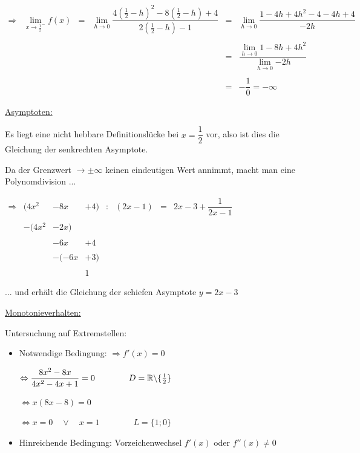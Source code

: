 \documentclass[main.tex]{subfiles}
\begin{document}
$\begin{array}{rccccl}
	\Rightarrow &  \lim\limits_{x \rightarrow {\frac{1}{2}}^{-}} {f(x)} &=& \lim\limits_{h \rightarrow 0} {\dfrac{4(\frac{1}{2} -h)^2 -8(\frac{1}{2} -h) +4}{2(\frac{1}{2}-h) -1} } &=& \lim\limits_{h \rightarrow 0} \dfrac{1-4h+4h^2-4-4h+4}{-2h} \\ \\
	&&&&=& \dfrac{\lim\limits_{h \rightarrow 0} {1-8h+4h^2} }{\lim\limits_{h \rightarrow 0}{-2h}} \\ \\
	&&&&=& -\dfrac {1}{0} = - \infty
\end{array}$

\underline{Asymptoten:}

Es liegt eine nicht hebbare Definitionslücke bei $x=\dfrac{1}{2}$ vor, also ist dies die Gleichung der senkrechten Asymptote.

Da der Grenzwert $\rightarrow \pm \infty$ keinen eindeutigen Wert annimmt, macht man eine Polynomdivision ...

$\begin{array}{rccccccl}
	\Rightarrow & (4x^2 & -8x & +4) & : & (2x-1) &=& 2x-3+\dfrac{1}{2x-1} \\ \\
	& -(4x^2 & -2x) & & & & & \\ \\
	& & -6x & +4 & & & & \\ \\
	& & -(-6x & +3) & & & & \\ \\
	& & & 1 & & & &
\end{array}$

... und erhält die Gleichung der schiefen Asymptote $y = 2x-3$

\underline{Monotonieverhalten:}

Untersuchung auf Extremstellen:
\begin{itemize}
\item Notwendige Bedingung: $\Rightarrow f'(x)=0$

	$\Leftrightarrow \dfrac{8x^2-8x}{4x^2-4x+1}=0 \qquad \qquad D=\mathbb{R} \backslash \{ \frac{1}{2} \}$

	$\Leftrightarrow x(8x-8)=0$

	$\Leftrightarrow x=0 \quad \lor \quad x=1 \qquad \qquad L=\{1;0\}$

\item Hinreichende Bedingung: Vorzeichenwechsel $f'(x)$ oder $f''(x)\neq 0$


\end{itemize}
\end{document}
